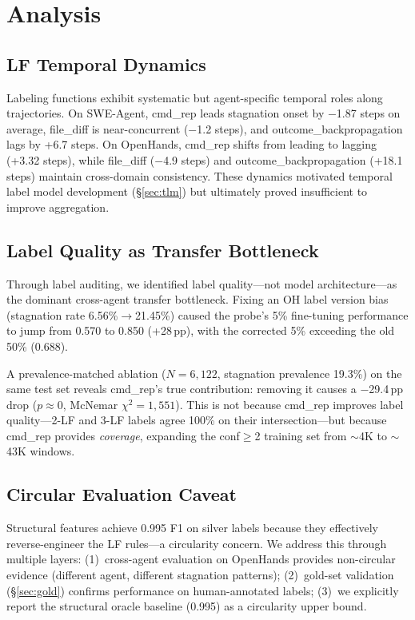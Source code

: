 \documentclass[11pt,a4paper]{article}
\begin{document}
\section{Analysis}
\label{sec:analysis}

\subsection{LF Temporal Dynamics}

Labeling functions exhibit systematic but agent-specific temporal roles along trajectories.
On SWE-Agent, cmd\_rep leads stagnation onset by $-$1.87 steps on average, file\_diff is near-concurrent ($-$1.2 steps), and outcome\_backpropagation lags by +6.7 steps.
On OpenHands, cmd\_rep shifts from leading to lagging (+3.32 steps), while file\_diff ($-$4.9 steps) and outcome\_backpropagation (+18.1 steps) maintain cross-domain consistency.
These dynamics motivated temporal label model development (\S\ref{sec:tlm}) but ultimately proved insufficient to improve aggregation.

\subsection{Label Quality as Transfer Bottleneck}

Through label auditing, we identified label quality---not model architecture---as the dominant cross-agent transfer bottleneck.
Fixing an OH label version bias (stagnation rate 6.56\%$\to$21.45\%) caused the probe's 5\% fine-tuning performance to jump from 0.570 to 0.850 (+28\,pp), with the corrected 5\% exceeding the old 50\% (0.688).

A prevalence-matched ablation ($N{=}6{,}122$, stagnation prevalence 19.3\%) on the same test set reveals cmd\_rep's true contribution: removing it causes a $-$29.4\,pp drop ($p\approx 0$, McNemar $\chi^2{=}1{,}551$).
This is not because cmd\_rep improves label quality---2-LF and 3-LF labels agree 100\% on their intersection---but because cmd\_rep provides \emph{coverage}, expanding the conf$\geq$2 training set from $\sim$4K to $\sim$43K windows.

\subsection{Circular Evaluation Caveat}

Structural features achieve 0.995 F1 on silver labels because they effectively reverse-engineer the LF rules---a circularity concern.
We address this through multiple layers:
(1)~cross-agent evaluation on OpenHands provides non-circular evidence (different agent, different stagnation patterns);
(2)~gold-set validation (\S\ref{sec:gold}) confirms performance on human-annotated labels;
(3)~we explicitly report the structural oracle baseline (0.995) as a circularity upper bound.
\end{document}
